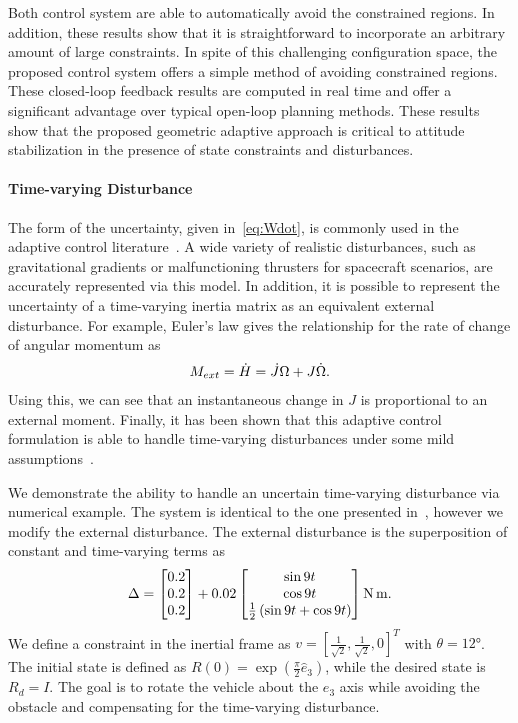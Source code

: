 Both control system are able to automatically avoid the constrained regions. 
In addition, these results show that it is straightforward to incorporate an arbitrary amount of large constraints.
In spite of this challenging configuration space, the proposed control system offers a simple method of avoiding constrained regions.
These closed-loop feedback results are computed in real time and offer a significant advantage over typical open-loop planning methods.
These results show that the proposed geometric adaptive approach is critical to attitude stabilization in the presence of state constraints and disturbances.

\paragraph{Time-varying Disturbance}\label{ssec:time_varying}

The form of the uncertainty, given in~\cref{eq:Wdot}, is commonly used in the adaptive control literature~\cite{lee2011a,ioannou2012}. 
A wide variety of realistic disturbances, such as gravitational gradients or malfunctioning thrusters for spacecraft scenarios, are accurately represented via this model. 
In addition, it is possible to represent the uncertainty of a time-varying inertia matrix as an equivalent external disturbance. 
For example, Euler's law gives the relationship for the rate of change of angular momentum as
\begin{align*}
    M_{ext} = \dot{H} = \dot{J} \Omega + J \dot{\Omega} .
\end{align*}
Using this, we can see that an instantaneous change in \( J \) is proportional to an external moment.
Finally, it has been shown that this adaptive control formulation is able to handle time-varying disturbances under some mild assumptions~\cite{ioannou2012}. 

We demonstrate the ability to handle an uncertain time-varying disturbance via numerical example.
The system is identical to the one presented in~, however we modify the external disturbance. 
The external disturbance is the superposition of constant and time-varying terms as
\begin{align*}
    \Delta = \begin{bmatrix} 0.2 \\ 0.2 \\0.2 \end{bmatrix} + 0.02 \begin{bmatrix} \sin 9 t \\ \cos 9 t \\ \frac{1}{2} \left( \sin 9t + \cos 9t \right)\end{bmatrix} \si{\newton\meter}.
\end{align*}
We define a constraint in the inertial frame as \( v = [\frac{1}{\sqrt{2}}, \frac{1}{\sqrt{2}}, 0]^T \) with \( \theta = \ang{12} \).
The initial state is defined as \(R(0) = \exp( \frac{\pi}{2} \hat{e}_3) \), while the desired state is \(R_d =I \).
The goal is to rotate the vehicle about the \( e_3 \) axis while avoiding the obstacle and compensating for the time-varying disturbance. 

